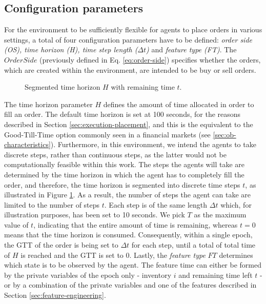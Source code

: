 \subsection{Configuration parameters}
\label{setup:parameters}
For the environment to be sufficiently flexible for agents to place orders in various settings, a total of four configuration parameters have to be defined: \textit{order side (OS), time horizon (H), time step length ($\Delta{t}$)} and \textit{feature type (FT)}.
The $OrderSide$ (previously defined in Eq. \ref{eq:order-side}) specifies whether the orders, which are created within the environment, are intended to be buy or sell orders.
\begin{figure}[H]
    \centering
    \caption{Segmented time horizon $H$ with remaining time $t$.}
    \label{fig:setup-time-horizon}
\end{figure}
The time horizon parameter $H$ defines the amount of time allocated in order to fill an order.
The default time horizon is set at 100 seconds, for the reasons described in Section \ref{sec:execution-placement}, and this is the equivalent to the Good-Till-Time option commonly seen in a financial markets (see \ref{sec:ob-characteristics}).
Furthermore, in this environment, we intend the agents to take discrete steps, rather than continuous steps, as the latter would not be computationally feasible within this work.
The steps the agents will take are determined by the time horizon in which the agent has to completely fill the order, and therefore, the time horizon is segmented into discrete time steps $t$, as illustrated in Figure \ref{fig:setup-time-horizon}. 
As a result, the number of steps the agent can take are limited to the number of steps $t$.
Each step is of the same length $\Delta{t}$ which,  for illustration purposes, has been set to 10 seconds.
We pick $T$ as the maximum value of $t$, indicating that the entire amount of time is remaining, whereas $t=0$ means that the time horizon is consumed.
Consequently, within a single epoch, the GTT of the order is being set to $\Delta{t}$ for each step, until a total of total time of $H$ is reached and the GTT is set to 0.
Lastly, the \textit{feature type} $FT$ determines which state is to be observed by the agent.
The feature time can either be formed by the private variables of the epoch only - inventory $i$ and remaining time left $t$ - or by a combination of the private variables and one of the features described in Section \ref{sec:feature-engineering}.

